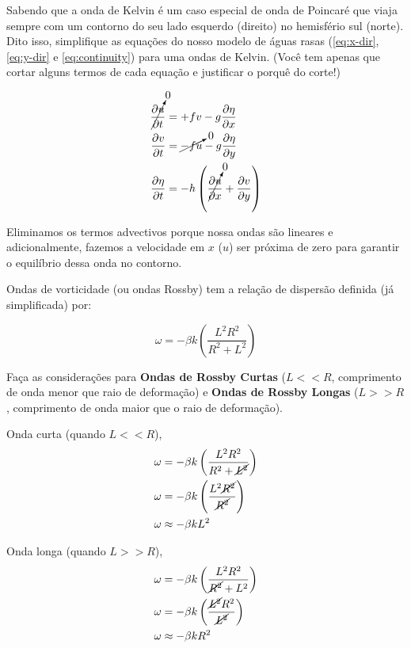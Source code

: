 \documentclass[letterpaper,portuguese,12pt,pdftex]{exam}
\newcommand{\pd}[2]{\dfrac{\partial #1}{\partial #2}}
\begin{document}
\begin{questions}
Sabendo que a onda de Kelvin é um caso especial de onda de Poincaré que viaja
sempre com um contorno do seu lado esquerdo (direito) no hemisfério sul (norte).
Dito isso, simplifique as equações do nosso modelo de águas rasas
(\ref{eq:x-dir}, \ref{eq:y-dir} e \ref{eq:continuity}) para uma ondas de Kelvin.
(Você tem apenas que cortar alguns termos de cada equação e justificar o porquê
do corte!)

\begin{solution}
  \begin{align*}
  \cancelto{0}{\pd{u}{t}} &= +fv -g\pd{\eta}{x}\\
  \pd{v}{t} &= \cancelto{0}{-fu} -g\pd{\eta}{y}\\
  \pd{\eta}{t} &= -h\left(\cancelto{0}{\pd{u}{x}} + \pd{v}{y}\right)
  \end{align*}

Eliminamos os termos advectivos porque nossa ondas são lineares e adicionalmente,
fazemos a velocidade em $x$ ($u$) ser próxima de zero para garantir o equilíbrio
dessa onda no contorno.
\end{solution}

\question[1]
Ondas de vorticidade (ou ondas Rossby) tem a relação de dispersão definida
(já simplificada) por:

  \[
    \omega = -\beta k \left( \dfrac{L^2 R^2}{R^2 + L^2} \right)
  \]


Faça as considerações para {\bf Ondas de Rossby Curtas} ($L << R$, comprimento
de onda menor que raio de deformação) e {\bf Ondas de Rossby Longas} ($L >> R$,
comprimento de onda maior que o raio de deformação).

  \begin{solution}
  Onda curta (quando $L << R$),
  \begin{align*}
    \omega &= -\beta k \left( \dfrac{L^2 R^2}{R^2 + \cancel{L^2}} \right) \\
    \omega &= -\beta k \left( \dfrac{L^2 \cancel{R^2}}{\cancel{R^2}} \right) \\
    \omega &\approx -\beta k L^2
  \end{align*}

  Onda longa (quando $L >> R$),
  \begin{align*}
    \omega &= -\beta k \left( \dfrac{L^2 R^2}{\cancel{R^2} + L^2} \right) \\
    \omega &= -\beta k \left( \dfrac{\cancel{L^2} R^2}{\cancel{L^2}} \right) \\
    \omega &\approx -\beta k R^2
  \end{align*}
\end{solution}

\end{questions}
\end{document}
